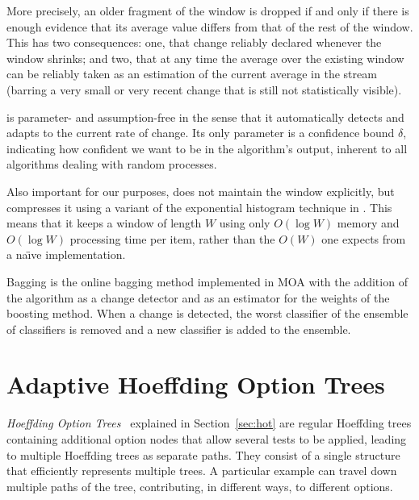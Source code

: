 More precisely, an older fragment of the window is dropped if and only if 
there is enough evidence that its average value differs from that of 
the rest of the window. 
This has two consequences: one, that change reliably declared whenever
the window shrinks; and two, that at any time the average over the existing
window can be reliably taken as an estimation of the current average in the stream
(barring a very small or very recent change that is still not statistically 
visible). %

\adwin is parameter- and assumption-free in the sense that 
it automatically detects and adapts to the current rate of change. 
Its only parameter is a confidence bound $\delta$,
indicating how confident we want to be in the algorithm's output, 
inherent to all algorithms dealing with random processes. 

Also important for our purposes, \adwin does not maintain the window
explicitly, but compresses it using a variant of the exponential histogram
technique in \cite{babcock-sampling}. This means that it keeps a window of length $W$
using only $O(\log W)$ memory and $O(\log W)$ processing time per item, 
rather than the $O(W)$ one expects from a na{\"\i}ve implementation. 

\adwin Bagging is the online bagging method %
implemented in MOA with the  addition of the \adwin algorithm as a change 
detector and as an estimator for the weights of the boosting method.
When a change is detected, the worst classifier of the ensemble of classifiers 
is removed and a new classifier is added to the ensemble.

\section{Adaptive Hoeffding Option Trees}
\label{Ssadahot}
                                                                  
{\em Hoeffding Option Trees}~\cite{optiontrees} 
explained in Section~\ref{sec:hot} are regular Hoeffding trees 
containing additional option nodes that allow several tests to be applied, 
leading to multiple Hoeffding trees as separate paths. 
They consist of a single structure that efficiently represents multiple
trees. A particular example can travel down multiple paths of the tree, contributing, 
in different ways, to different options.

